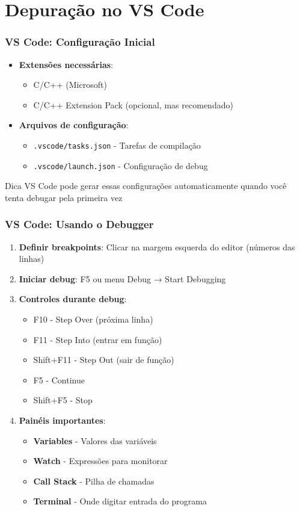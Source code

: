 \documentclass[aspectratio=169]{beamer}
\begin{document}
\section{Depuração no VS Code}

\begin{frame}
\frametitle{VS Code: Configuração Inicial}
\begin{itemize}
    \item \textbf{Extensões necessárias}:
    \begin{itemize}
        \item C/C++ (Microsoft)
        \item C/C++ Extension Pack (opcional, mas recomendado)
    \end{itemize}
    \item \textbf{Arquivos de configuração}:
    \begin{itemize}
        \item \texttt{.vscode/tasks.json} - Tarefas de compilação
        \item \texttt{.vscode/launch.json} - Configuração de debug
    \end{itemize}
\end{itemize}

\begin{block}{Dica}
VS Code pode gerar essas configurações automaticamente quando você tenta debugar pela primeira vez
\end{block}
\end{frame}

\begin{frame}
\frametitle{VS Code: Usando o Debugger}
\begin{enumerate}
    \item \textbf{Definir breakpoints}: Clicar na margem esquerda do editor (números das linhas)
    \item \textbf{Iniciar debug}: F5 ou menu Debug → Start Debugging
    \item \textbf{Controles durante debug}:
    \begin{itemize}
        \item F10 - Step Over (próxima linha)
        \item F11 - Step Into (entrar em função)
        \item Shift+F11 - Step Out (sair de função)
        \item F5 - Continue
        \item Shift+F5 - Stop
    \end{itemize}
    \item \textbf{Painéis importantes}:
    \begin{itemize}
        \item \textbf{Variables} - Valores das variáveis
        \item \textbf{Watch} - Expressões para monitorar
        \item \textbf{Call Stack} - Pilha de chamadas
        \item \textbf{Terminal} - Onde digitar entrada do programa
    \end{itemize}
\end{enumerate}
\end{frame}
\end{document}
